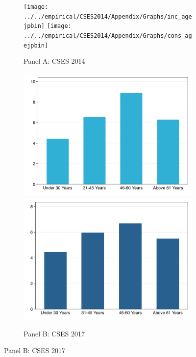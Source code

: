 \documentclass[11pt,letterpaper]{article}
\begin{document}
\begin{figure}
	\caption{Average household income and consumption by age group}
	\label{fig:3}
	\begin{subfigure}[b]{0.33\linewidth}
		\caption*{Panel A: CSES 2014} \vspace{-.5em}
		\label{fig:3a}
		\texttt{[image: ../../empirical/CSES2014/Appendix/Graphs/inc\_agejpbin]} 
		\vspace{-2.5em}
		\newline {}
		\texttt{[image: ../../empirical/CSES2014/Appendix/Graphs/cons\_agejpbin]} 
		\vspace{-2.5em}
		\newline {}
	\end{subfigure}%
	\hfil
	\begin{subfigure}[b]{0.33\linewidth}
		\caption*{Panel B: CSES 2017} \vspace{-.5em}
		\label{fig:3b}
		\includegraphics[width=1\linewidth]{../../empirical/CSES2017/Appendix/Graphs/inc_agejpbin} 
		\vspace{-2.5em}
		\newline {}
		\includegraphics[width=1\linewidth]{../../empirical/CSES2017/Appendix/Graphs/cons_agejpbin} 

\end{subfigure}
\end{figure}
\end{document}
